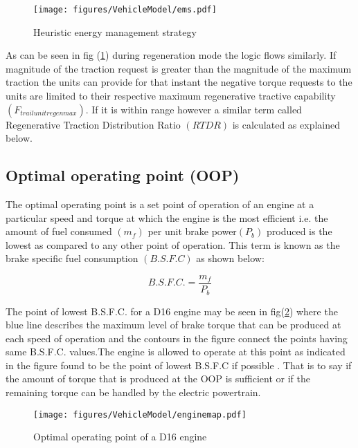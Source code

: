 \documentclass[MastersThesis.tex]{subfiles}
\begin{document}
\begin{figure}
	\begin{center}
		\texttt{[image: figures/VehicleModel/ems.pdf]}
	\end{center}
	\caption{Heuristic energy management strategy}
	\label{fig:ems}
\end{figure}
	
As can be seen in fig (\ref{fig:ems}) during regeneration mode the logic flows similarly. If magnitude of the traction request is greater than the magnitude of the maximum traction the units can provide for that instant the negative torque requests to the units are limited to their respective maximum regenerative tractive capability$(F_{trailunitregenmax})$. If it is within range however a similar term called Regenerative Traction Distribution Ratio $(RTDR)$ is calculated as explained below.

\subsection{Optimal operating point (OOP)} \label{sec:oop}
The optimal operating point is a set point of operation of an engine at a particular speed and torque at which the engine is the most efficient i.e. the amount of fuel consumed $(m_f)$ per unit brake power$(P_b)$ produced is the lowest as compared to any other point of operation. This term is known as the brake specific fuel consumption $(B.S.F.C)$ as shown below:

\begin{equation} \label{eq:bsfc}
B.S.F.C.=\frac{m_f}{P_b}
\end{equation}
 
The point of lowest B.S.F.C. for a D16 engine may be seen in fig(\ref{fig:enginemap}) where the blue line describes the maximum level of brake torque that can be produced at each speed of operation and the contours in the figure connect the points having same B.S.F.C. values.The engine is allowed to operate at this point as indicated in the figure found to be the point of lowest B.S.F.C if possible . That is to say if the amount of torque that is produced at the OOP is sufficient or if the remaining torque can be handled by the electric powertrain. 

\begin{figure}
	\begin{center}
		\texttt{[image: figures/VehicleModel/enginemap.pdf]}
	\end{center}
	\caption{Optimal operating point of a D16 engine}
	\label{fig:enginemap}
\end{figure}
\end{document}
